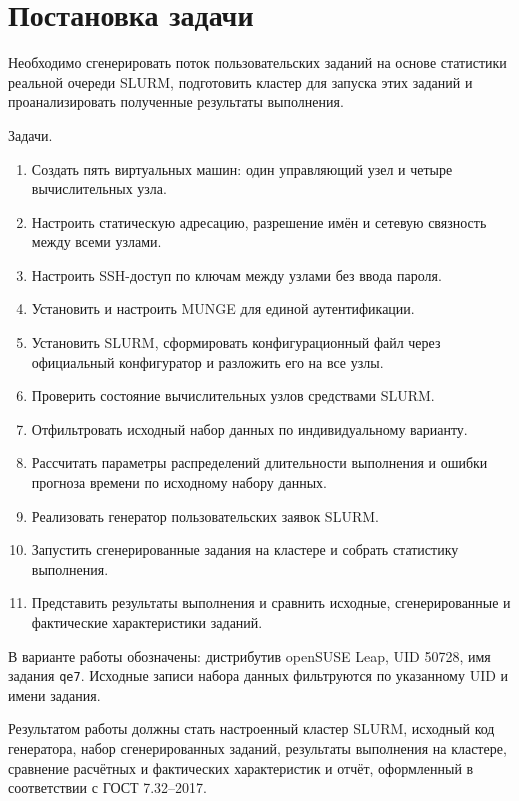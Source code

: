 \section{Постановка задачи}

Необходимо сгенерировать поток пользовательских заданий на основе статистики реальной очереди SLURM, подготовить кластер для запуска этих заданий и проанализировать полученные результаты выполнения.

Задачи.

\begin{enumerate}
    \item Создать пять виртуальных машин: один управляющий узел и четыре вычислительных узла.
    \item Настроить статическую адресацию, разрешение имён и сетевую связность между всеми узлами.
    \item Настроить SSH-доступ по ключам между узлами без ввода пароля.
    \item Установить и настроить MUNGE для единой аутентификации.
    \item Установить SLURM, сформировать конфигурационный файл через официальный конфигуратор и разложить его на все узлы.
    \item Проверить состояние вычислительных узлов средствами SLURM.
    \item Отфильтровать исходный набор данных по индивидуальному варианту.
    \item Рассчитать параметры распределений длительности выполнения и ошибки прогноза времени по исходному набору данных.
    \item Реализовать генератор пользовательских заявок SLURM.
    \item Запустить сгенерированные задания на кластере и собрать статистику выполнения.
    \item Представить результаты выполнения и сравнить исходные, сгенерированные и фактические характеристики заданий.
\end{enumerate}

В варианте работы обозначены: дистрибутив openSUSE Leap, UID 50728, имя задания \texttt{qe7}. Исходные записи набора данных фильтруются по указанному UID и имени задания.

Результатом работы должны стать настроенный кластер SLURM, исходный код генератора, набор сгенерированных заданий, результаты выполнения на кластере, сравнение расчётных и фактических характеристик и отчёт, оформленный в соответствии с ГОСТ 7.32--2017.
